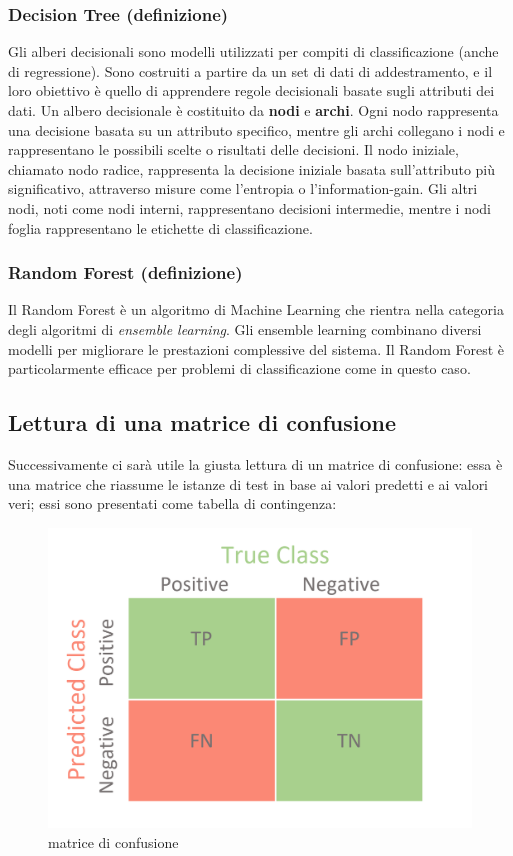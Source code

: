 \documentclass{article}
\begin{document}
\begin{titlepage}
        \subsubsection{Decision Tree (definizione)}
        Gli alberi decisionali sono modelli utilizzati per compiti di classificazione (anche di regressione). Sono costruiti a partire da un set di dati di addestramento, e il loro obiettivo è quello di apprendere regole decisionali basate sugli attributi dei dati.
        Un albero decisionale è costituito da \textbf{nodi} e \textbf{archi}. Ogni nodo rappresenta una decisione basata su un attributo specifico, mentre gli archi collegano i nodi e rappresentano le possibili scelte o risultati delle decisioni. Il nodo iniziale, chiamato nodo radice, rappresenta la decisione iniziale basata sull'attributo più significativo, attraverso misure come l’entropia
        o l’information-gain. Gli altri nodi, noti come nodi interni, rappresentano decisioni intermedie, mentre i nodi foglia rappresentano le etichette di classificazione.

        \subsubsection{Random Forest (definizione)}
         Il Random Forest è un algoritmo di Machine Learning che rientra nella categoria degli algoritmi di \textit {ensemble learning}. Gli ensemble learning combinano diversi modelli per migliorare le prestazioni complessive del sistema. Il Random Forest è particolarmente efficace per problemi di classificazione come in questo caso.
        \subsection{Lettura di una matrice di confusione}
        Successivamente ci sarà utile la giusta lettura di un matrice di confusione: essa è una  matrice che riassume le istanze di test in base ai valori
        predetti e ai valori veri; essi sono presentati come tabella di contingenza:
        \begin{figure}[ht]
            \centering
            \includegraphics[width=0.6\linewidth]{generic_confusion_matrix.png}
            \caption{  matrice di confusione}
            \label{fig:enter-label}
        \end{figure}
        

\end{titlepage}
\end{document}
